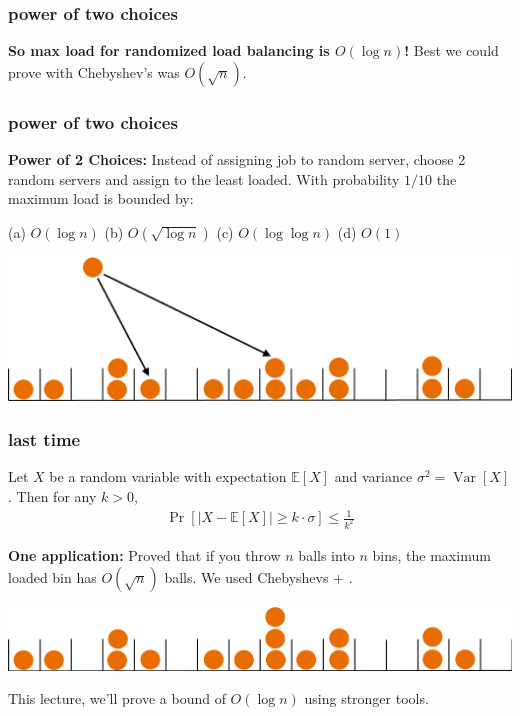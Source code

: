 \documentclass[compress]{beamer}
\newcommand{\E}{\mathbb{E}}
\DeclareMathOperator{\Var}{Var}
\begin{document}
\begin{frame}
	\frametitle{power of two choices}
	\begin{center}\alert{\textbf{So max load for randomized load balancing is $O(\log n)$!}} Best we could prove with Chebyshev's was $O(\sqrt{n})$. \end{center}
\end{frame}

\begin{frame}
	\frametitle{power of two choices}
	\textbf{Power of 2 Choices:} Instead of assigning job to random server, choose 2 random servers and assign to the least loaded. With probability $1/10$ the maximum load is bounded by:
	
	(a) $O(\log n)$ \hspace{1em} (b) $O(\sqrt{\log n})$  \hspace{1em}  (c) $O(\log \log n)$  \hspace{1em} (d) $O(1)$
	\begin{center}
		\includegraphics[width=.9\textwidth]{power_of_two.png}
	\end{center}
\end{frame}

\begin{frame}[t]
	\frametitle{last time}
	\begin{lemma}
		Let $X$ be a random variable with expectation $\E[X]$ and variance $\sigma^2 = \Var[X]$. Then for any $k > 0$,
		\begin{align*}
			\Pr[|X - \E[X]| \geq k\cdot\sigma] \leq \frac{1}{k^2}
		\end{align*}
	\end{lemma}
	\vspace{-.5em}
	\textbf{One application:} Proved that if you throw $n$ balls into $n$ bins, the maximum loaded bin has $O(\sqrt{n})$  balls.  We used Chebyshevs + \underline{\hspace{10em}}.
	\begin{center}
		\includegraphics[width=.7\textwidth]{ballsinbins.png}
	\end{center}
This lecture, we'll prove a bound of $O(\log n)$ using stronger tools. 
\end{frame}
\end{document}
